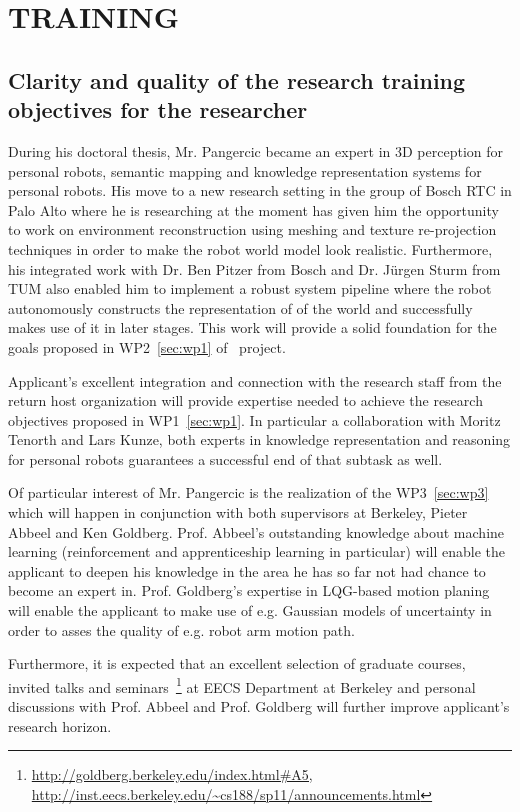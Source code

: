 \section{TRAINING} %
\label{sec:training}
\subsection{Clarity and quality of the research training objectives for the researcher}
During his doctoral thesis, Mr. Pangercic became an expert in 3D perception for personal robots, 
semantic mapping  and knowledge representation systems for personal robots. His move to a new 
research setting in the group  of Bosch RTC in Palo Alto where he is researching at the moment has 
given him the opportunity to work on environment reconstruction using meshing and texture re-projection 
techniques in order to make the robot world model look realistic. Furthermore, his integrated work with 
Dr. Ben Pitzer from Bosch and Dr. J\"urgen Sturm from TUM also enabled him to implement 
a robust system pipeline where the robot autonomously constructs the representation of 
of the world and successfully makes use of it in later stages. This work will provide a solid
foundation for the goals proposed in WP2~\ref{sec:wp1} of \ksem\ project.

Applicant's excellent integration and connection with the research staff from the return
host organization will provide expertise needed to achieve the research objectives proposed
in WP1~\ref{sec:wp1}. In particular a collaboration with Moritz Tenorth and Lars Kunze, both
experts in knowledge representation and reasoning for personal robots guarantees a successful
end of that subtask as well.

Of particular interest of Mr. Pangercic is the realization of the WP3~\ref{sec:wp3} which
will happen in conjunction with both supervisors at Berkeley, Pieter Abbeel and Ken Goldberg.
Prof. Abbeel's outstanding knowledge about machine learning (reinforcement and apprenticeship
learning in particular) will enable the applicant to deepen his knowledge in the area he has
so far not had chance to become an expert in. Prof. Goldberg's expertise in LQG-based motion planing 
will enable the applicant to make use of e.g. Gaussian models of uncertainty in order to asses
the quality of e.g. robot arm motion path.

Furthermore, it is expected that an excellent selection of graduate courses, invited talks and 
seminars~\footnote{\url{http://goldberg.berkeley.edu/index.html\#A5, 
 http://inst.eecs.berkeley.edu/~cs188/sp11/announcements.html}} at EECS Department at Berkeley and 
personal discussions with Prof. Abbeel and Prof. Goldberg will further improve applicant's research 
horizon.
